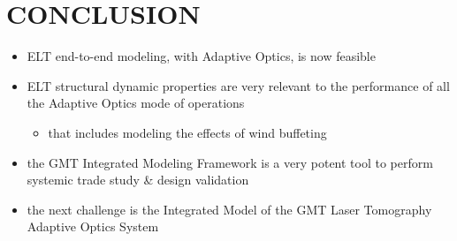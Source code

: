 \documentclass[]{AO4ELT}  %
\begin{document}
\clearpage

\section{CONCLUSION}
\label{sec:conclusion}

\begin{itemize}
   \item ELT end-to-end modeling, with Adaptive Optics, is now feasible
   \item ELT structural dynamic properties are very relevant to the performance of all the Adaptive Optics mode of operations
         \begin{itemize}
            \item that includes modeling the effects of wind buffeting
         \end{itemize}
   \item the GMT Integrated Modeling Framework is a very potent tool to perform systemic trade study \& design validation
   \item the next challenge is the Integrated Model of the GMT Laser Tomography Adaptive Optics System
\end{itemize}

\end{document}
